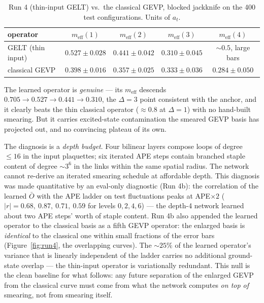 \documentclass[11pt,a4paper]{article}
\newcommand{\Obar}{\bar{O}}
\newcommand{\meff}{m_{\mathrm{eff}}}
\newcommand{\at}{a_t}
\begin{document}
\begin{table}[htbp]
  \centering
  \begin{tabular}{lcccc}
    \toprule
    operator & $\meff(1)$ & $\meff(2)$ & $\meff(3)$ & $\meff(4)$ \\
    \midrule
    GELT (thin input)   & $0.527\pm0.028$ & $0.441\pm0.042$ & $0.310\pm0.045$ & $\sim0.5$, large bars \\
    classical GEVP      & $0.398\pm0.016$ & $0.357\pm0.025$ & $0.333\pm0.036$ & $0.284\pm0.050$ \\
    \bottomrule
  \end{tabular}
  \caption{Run 4 (thin-input GELT) vs.\ the classical GEVP, blocked jackknife
  on the 400 test configurations. Units of $\at$.}
  \label{tab:run4}
\end{table}

The learned operator is \emph{genuine} --- its $\meff$ descends
$0.705\to0.527\to0.441\to0.310$, the $\Delta=3$ point consistent with the
anchor, and it clearly beats the thin classical operator
($\approx0.8$ at $\Delta=1$) with no hand-built smearing. But it carries
excited-state contamination the smeared GEVP basis has projected out, and no
convincing plateau of its own.

The diagnosis is a \emph{depth budget}. Four bilinear layers compose loops of
degree $\le16$ in the input plaquettes; six iterated APE steps contain
branched staple content of degree $\sim3^6$ in the links within the same
spatial radius. The network cannot re-derive an iterated smearing schedule at
affordable depth. This diagnosis was made quantitative by an eval-only
diagnostic (Run 4b): the correlation of the learned $\Obar$ with the APE
ladder on test fluctuations peaks at APE$\times2$
($|r| = 0.68,\ \mathbf{0.87},\ 0.71,\ 0.59$ for levels $0,2,4,6$) --- the
depth-4 network learned about two APE steps' worth of staple content.
Run 4b also appended the learned operator to the classical basis as a fifth
GEVP operator: the enlarged basis is \emph{identical} to the classical one
within small fractions of the error bars (Figure~\ref{fig:run4}, the
overlapping curves). The $\sim25\%$ of the learned operator's variance that
is linearly independent of the ladder carries no additional ground-state
overlap --- the thin-input operator is variationally redundant. This null is
the clean baseline for what follows: any future separation of the enlarged
GEVP from the classical curve must come from what the network computes
\emph{on top of} smearing, not from smearing itself.
\end{document}
